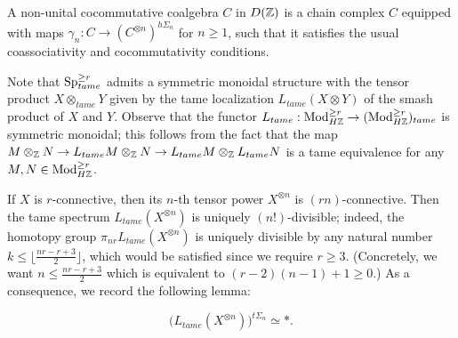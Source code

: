 A non-unital cocommutative coalgebra $C$ in $D({\mathbb{Z}})$ is a chain complex $C$ equipped with maps $\gamma_n: C \to (C^{\otimes n})^{h\Sigma_n}$ for $n\geq 1$, such that it satisfies the usual coassociativity and cocommutativity conditions. 

\begin{remark}
	Note that $\operatorname{Sp}^{\geq r}_{tame}$ admits a symmetric monoidal structure with the tensor product $X\otimes_{tame} Y$ given by the tame localization $L_{tame}(X\otimes Y)$ of the smash product of $X$ and $Y$. Observe that the functor $L_{tame}:\operatorname{Mod}_{H{\mathbb{Z}}}^{\geq r}\to (\operatorname{Mod}_{H{\mathbb{Z}}}^{\geq r})_{tame}$ is symmetric monoidal; this follows from the fact that the map $M \otimes_{{\mathbb{Z}}} N \to L_{tame}M\otimes_{{\mathbb{Z}}} N \to L_{tame}M\otimes_{{\mathbb{Z}}} L_{tame}N$ is a tame equivalence for any $M,N\in \operatorname{Mod}_{H{\mathbb{Z}}}^{\geq r}$.
\end{remark}


%

If $X$ is $r$-connective, then its $n$-th tensor power $X^{\otimes n}$ is $(rn)$-connective. Then the tame spectrum $L_{tame}(X^{\otimes n})$ is uniquely $(n!)$-divisible; indeed, the homotopy group $\pi_{nr}L_{tame}(X^{\otimes n})$ is uniquely divisible by any natural number $k\leq \lfloor \frac{nr-r+3}{2}\rfloor$, which would be satisfied since we require $r\geq 3$. (Concretely, we want $n\leq \frac{nr-r+3}{2}$ which is equivalent to $(r-2)(n-1)+1\geq 0$.)
As a consequence, we record the following lemma:
\begin{lemma}
\label{Tate vanishing for tame spectra}
	$$
	\big(L_{tame}(X^{\otimes n})\big)^{t\Sigma_n}\simeq *.
	$$
\end{lemma}




